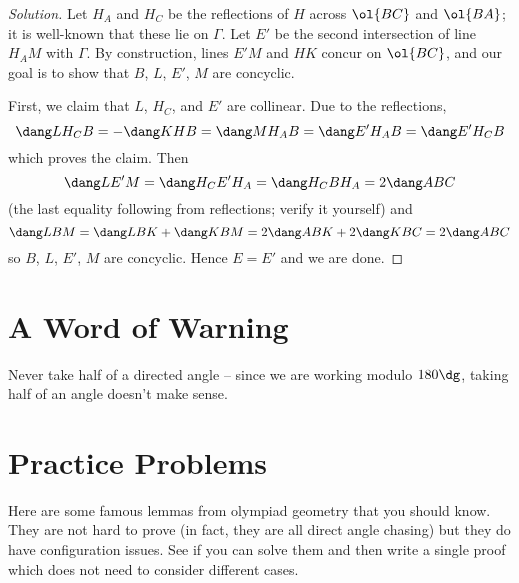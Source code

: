 \documentclass[11pt]{scrartcl}
\begin{document}
\begin{proof}
  [Solution]
  Let $H_A$ and $H_C$ be the reflections of $H$ across $\ol{BC}$ and $\ol{BA}$; it is well-known that these lie on $\Gamma$.
  Let $E'$ be the second intersection of line $H_AM$ with $\Gamma$.
  By construction, lines $E'M$ and $HK$ concur on $\ol{BC}$, and our goal is to show that $B$, $L$, $E'$, $M$ are concyclic.

  First, we claim that $L$, $H_C$, and $E'$ are collinear.
  Due to the reflections,
  \[ \dang LH_CB = -\dang KHB = \dang MH_AB
  = \dang E'H_AB = \dang E'H_CB \]
  which proves the claim.
  Then
  \[ \dang LE'M = \dang H_CE'H_A = \dang H_CBH_A = 2\dang ABC \]
  (the last equality following from reflections; verify it yourself) and
  \[ \dang LBM = \dang LBK + \dang KBM = 2\dang ABK + 2\dang KBC = 2\dang ABC \]
  so $B$, $L$, $E'$, $M$ are concyclic. Hence $E=E'$ and we are done.
\end{proof}


\section{A Word of Warning}
Never take half of a directed angle -- since we are working modulo $180\dg$,
taking half of an angle doesn't make sense.

\section{Practice Problems}
Here are some famous lemmas from olympiad geometry that you should know.
They are not hard to prove (in fact, they are all direct angle chasing) but they do have configuration issues.
See if you can solve them and then write a single proof which does not need to consider different cases.
\end{document}
